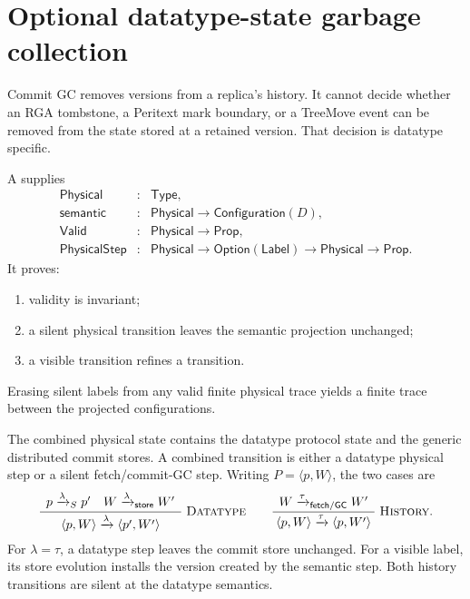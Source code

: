 \section{Optional datatype-state garbage collection}

Commit GC removes versions from a replica's history. It cannot decide whether
an RGA tombstone, a Peritext mark boundary, or a TreeMove event can be removed
from the state stored at a retained version. That decision is datatype
specific.

\begin{definition}
A  supplies
\[
\begin{array}{rcl}
\mathsf{Physical}&:&\mathsf{Type},\\
\mathsf{semantic}&:&\mathsf{Physical}\to\mathsf{Configuration}(D),\\
\mathsf{Valid}&:&\mathsf{Physical}\to\mathsf{Prop},\\
\mathsf{PhysicalStep}&:&
 \mathsf{Physical}\to\mathsf{Option}(\mathsf{Label})\to
 \mathsf{Physical}\to\mathsf{Prop}.
\end{array}
\]
It proves:
\begin{enumerate}
\item validity is invariant;
\item a silent physical transition leaves the semantic projection unchanged;
\item a visible transition refines a  transition.
\end{enumerate}
\end{definition}

\begin{theorem}
Erasing silent labels from any valid finite physical trace yields a finite
 trace between the projected configurations.
\hfill{}
\end{theorem}

The combined physical state contains the datatype protocol state and the
generic distributed commit stores. A combined transition is either a datatype
physical step or a silent fetch/commit-GC step.
Writing $P=\langle p,W\rangle$, the two cases are
\[
\Rule{Datatype}{p\xrightarrow{\lambda}_{S}p'\quad
  W\xrightarrow{\lambda}_{\mathsf{store}}W'}{
  \langle p,W\rangle\xrightarrow{\lambda}\langle p',W'\rangle}
\qquad
\Rule{History}{W\xrightarrow{\tau}_{\mathsf{fetch/GC}}W'}{
  \langle p,W\rangle\xrightarrow{\tau}\langle p,W'\rangle}.
\]
For $\lambda=\tau$, a datatype step leaves the commit store unchanged. For a
visible label, its store evolution installs the version created by the
semantic step. Both history transitions are silent at the datatype semantics.

